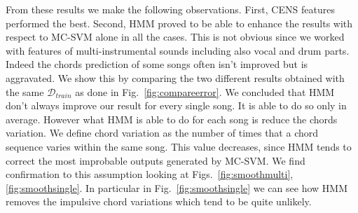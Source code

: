 %
From these results we make the following observations. First, CENS features performed the best. Second, HMM proved to be able to enhance the results with respect to MC-SVM alone in all the cases. This is not obvious since we worked with features of multi-instrumental sounds including also vocal and drum parts. Indeed the chords prediction of some songs often isn't improved but is aggravated. We show this by comparing the two different results obtained with the same $\mathcal{D}_{train}$ as done in Fig.~\ref{fig:compareerror}.
%
We concluded that HMM don't always improve our result for every single song. It is able to do so only in average. However what HMM is able to do for each song is reduce the chords variation. We define chord variation as the number of times that a chord sequence varies within the same song. This value decreases, since HMM tends to correct the most improbable outputs generated by MC-SVM. We find confirmation to this assumption looking at Figs.~\ref{fig:smoothmulti},\ref{fig:smoothsingle}. In particular in Fig.~\ref{fig:smoothsingle} we can see how HMM removes the impulsive chord variations which tend to be quite unlikely.
